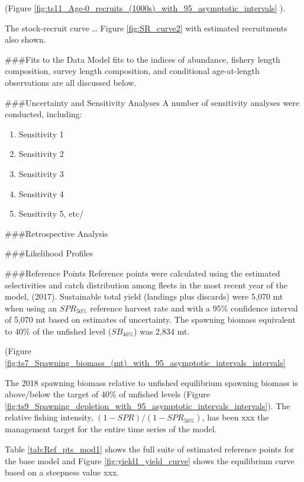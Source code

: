 \documentclass[12pt,]{article}
\begin{document}
(Figure
\ref{fig:ts11_Age-0_recruits_(1000s)_with_95_asymptotic_intervals} ).

The stock-recruit curve \ldots{} Figure \ref{fig:SR_curve2} with
estimated recruitments also shown.

\#\#\#Fits to the Data Model fits to the indices of abundance, fishery
length composition, survey length composition, and conditional
age-at-length observations are all discussed below.

\#\#\#Uncertainty and Sensitivity Analyses A number of sensitivity
analyses were conducted, including:

\begin{enumerate}

  \item Sensitivity 1
  
  \item Sensitivity 2
  
  \item Sensitivity 3
  
  \item Sensitivity 4
  
  \item Sensitivity 5, etc/
  
  
\end{enumerate}

\#\#\#Retrospective Analysis

\#\#\#Likelihood Profiles

\#\#\#Reference Points Reference points were calculated using the
estimated selectivities and catch distribution among fleets in the most
recent year of the model, (2017). Sustainable total yield (landings plus
discards) were 5,070 mt when using an \(SPR_{50\%}\) reference harvest
rate and with a 95\% confidence interval of 5,070 mt based on estimates
of uncertainty. The spawning biomass equivalent to 40\% of the unfished
level (\(SB_{40\%}\)) was 2,834 mt.

(Figure
\ref{fig:ts7_Spawning_biomass_(mt)_with_95_asymptotic_intervals_intervals}

The 2018 spawning biomass relative to unfished equilibrium spawning
biomass is above/below the target of 40\% of unfished levels (Figure
\ref{fig:ts9_Spawning_depletion_with_95_asymptotic_intervals_intervals}).
The relative fishing intensity, \((1-SPR)/(1-SPR_{50\%})\), has been xxx
the management target for the entire time series of the model.

Table \ref{tab:Ref_pts_mod1} shows the full suite of estimated reference
points for the base model and Figure \ref{fig:yield1_yield_curve} shows
the equilibrium curve based on a steepness value xxx.
\end{document}
